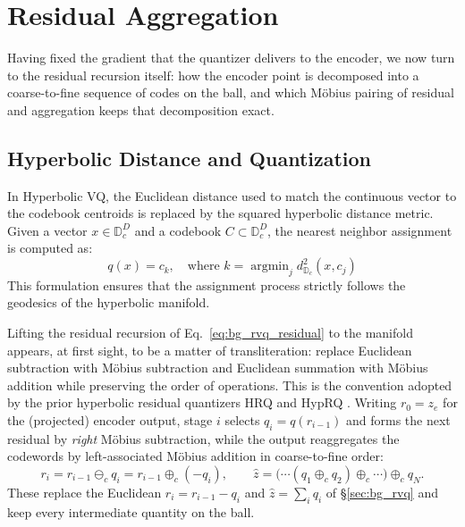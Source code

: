 \documentclass[12pt]{report}
\begin{document}
\section{Residual Aggregation}
\label{sec:residagg}
Having fixed the gradient that the quantizer delivers to the encoder, we now turn to the residual recursion itself: how the encoder point is decomposed into a coarse-to-fine sequence of codes on the ball, and which M\"obius pairing of residual and aggregation keeps that decomposition exact.

\subsection{Hyperbolic Distance and Quantization}
\label{sec:hrq}
In Hyperbolic VQ, the Euclidean distance used to match the continuous vector to the codebook centroids is replaced by the squared hyperbolic distance metric. Given a vector $x \in \mathbb{D}_c^D$ and a codebook $C \subset \mathbb{D}_c^D$, the nearest neighbor assignment is computed as:
\begin{equation}
    q(x) = c_k, \quad \text{where } k = \operatorname{argmin}_j d_{\mathbb{D}_c}^2(x, c_j)
\end{equation}
This formulation ensures that the assignment process strictly follows the geodesics of the hyperbolic manifold.

Lifting the residual recursion of Eq.~\ref{eq:bg_rvq_residual} to the manifold appears, at first sight, to be a matter of transliteration: replace Euclidean subtraction with M\"obius subtraction and Euclidean summation with M\"obius addition while preserving the order of operations. This is the convention adopted by the prior hyperbolic residual quantizers HRQ \cite{hrqvae} and HypRQ \cite{hyprqvae_recsys}. Writing $r_0 = z_e$ for the (projected) encoder output, stage $i$ selects $q_i = q(r_{i-1})$ and forms the next residual by \emph{right} M\"obius subtraction, while the output reaggregates the codewords by left-associated M\"obius addition in coarse-to-fine order:
\begin{equation}
    \label{eq:prev_residual}
    r_i = r_{i-1}\ominus_c q_i = r_{i-1}\oplus_c(-q_i),
    \qquad
    \hat z = \big(\cdots(q_1\oplus_c q_2)\oplus_c\cdots\big)\oplus_c q_N .
\end{equation}
These replace the Euclidean $r_i = r_{i-1}-q_i$ and $\hat z=\sum_i q_i$ of \S\ref{sec:bg_rvq} and keep every intermediate quantity on the ball.
\end{document}
